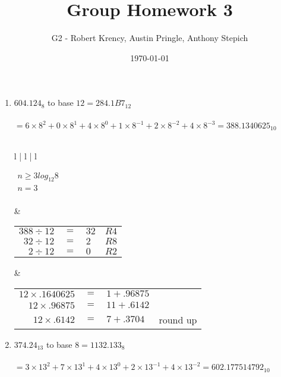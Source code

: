 \documentclass[12pt]{article}
\title{Group Homework 3}
\author{G2 - Robert Krency, Austin Pringle, Anthony Stepich}
\date{\today}
\begin{document}
\maketitle

\begin{enumerate}

    \item $604.124_{8}$ to base $12 = \boxed{284.1B7_{12}}$ \\ \\
    $ = 6 \times 8^2 + 0 \times 8^1 + 4 \times 8^0 + 1 \times 8^{-1} + 2 \times 8^{-2} + 4 \times 8^{-3} = 388.1340625_{10}$ \\\\
    \begin{tabular}{l | l | l}
        

       $\begin{aligned}
           n \geq 3log_{12}8 \\
           n = 3 \\
       \end{aligned}$

       &

       \begin{tabular}{r c l l}
           $388 \div 12$ & $=$ & $32$ & $R4$ \\
           $32 \div 12$  & $=$ & $2$ & $R8$  \\
           $2 \div 12$   & $=$ & $0$ & $R2$  \\
       \end{tabular}

       &

       \begin{tabular}{r c l l}
           $12 \times .1640625$ & $=$ & $1 + .96875$ & \\
           $12 \times .96875$ & $=$ & $11 + .6142$ & \\
           $12 \times .6142$ & $=$ & $7 + .3704$ & round up \\
       \end{tabular}
       

    \end{tabular}

    \item $374.24_{13}$ to base $8 = \boxed{1132.133_{8}}$ \\ \\
    $ = 3 \times 13^2 + 7 \times 13^1 + 4 \times 13^0 + 2 \times 13^{-1} + 4 \times 13^{-2} = 602.177514792_{10}$ \\\\
    \begin{tabular}{l | l | l}
        


\end{tabular}
\end{enumerate}
\end{document}
